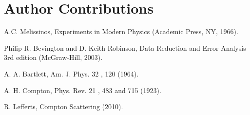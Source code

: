 \documentclass[%
 reprint,
 amsmath,amssymb,
 aps,
 pra,
]{revtex4-1}
\begin{document}
\section{Author Contributions}

\begin{thebibliography}{5}
	
	A.C. Melissinos, Experiments in Modern Physics (Academic Press, NY, 1966).
	
	Philip R. Bevington and D. Keith Robinson, Data Reduction and Error Analysis 3rd edition (McGraw-Hill, 2003).

	A. A. Bartlett, Am. J. Phys. 32 , 120 (1964).
	
	A. H. Compton, Phys. Rev. 21 , 483 and 715 (1923).
	
	R. Lefferts, Compton Scattering (2010).


\end{thebibliography}
\end{document}
